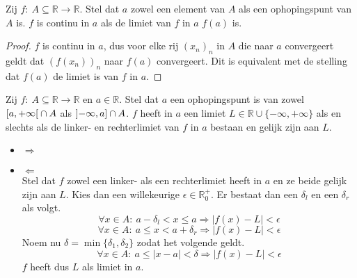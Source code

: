 \documentclass[main.tex]{subfiles}
\begin{document}
\begin{bpr}
  \label{pr:functie-continu-asa-limiet-is-beeld}
  Zij $f:\ A \subseteq \mathbb{R} \rightarrow \mathbb{R}$.
  Stel dat $a$ zowel een element van $A$ als een ophopingspunt van $A$ is.
  $f$ is continu in $a$ als de limiet van $f$ in $a$ $f(a)$ is.

  \begin{proof}
    $f$ is continu in $a$, dus voor elke rij $(x_{n})_{n}$ in $A$ die naar $a$ convergeert geldt dat $(f(x_{n}))_{n}$ naar $f(a)$ convergeert.
    Dit is equivalent met de stelling dat $f(a)$ de limiet is van $f$ in $a$.
  \end{proof}
\end{bpr}

\begin{bpr}
  Zij $f:\ A \subseteq \mathbb{R} \rightarrow \mathbb{R}$ en $a\in \mathbb{R}$.
  Stel dat $a$ een ophopingspunt is van zowel $\interval[open right]{a}{+\infty} \cap A$ als $\interval[open left]{-\infty}{a} \cap A$.
  $f$ heeft in $a$ een limiet $L\in \mathbb{R}\cup \{ -\infty,+\infty\}$ als en slechts als de linker- en rechterlimiet van $f$ in $a$ bestaan en gelijk zijn aan $L$.

  \begin{itemize}
  \item $\Rightarrow$\\
  \item $\Leftarrow$\\
    Stel dat $f$ zowel een linker- als een rechterlimiet heeft in $a$ en ze beide gelijk zijn aan $L$.
    Kies dan een willekeurige $\epsilon\in\mathbb{R}_{0}^{+}$.
    Er bestaat dan een $\delta_{l}$ en een $\delta_{r}$ als volgt.
    \[ \forall x\in A:\ a-\delta_{l}<x\le a \Rightarrow |f(x)-L|<\epsilon \]
    \[ \forall x\in A:\ a\le x < a+\delta_{r} \Rightarrow |f(x)-L|<\epsilon \]
    Noem nu $\delta = \min\{\delta_{1},\delta_{2}\}$ zodat het volgende geldt.
    \[ \forall x\in A:\ a\le |x-a|<\delta \Rightarrow |f(x)-L|<\epsilon \]
    $f$ heeft dus $L$ als limiet in $a$.
  \end{itemize}
\end{bpr}
\end{document}
